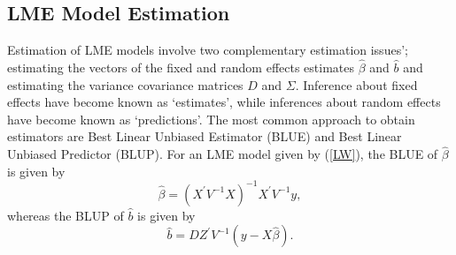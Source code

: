\documentclass[12pt, a4paper]{report}
\theoremstyle{plain}
\theoremstyle{definition}
\theoremstyle{remark}
\begin{document}
			
			
\subsection{LME Model Estimation}
Estimation of LME models involve two complementary estimation issues'; estimating the vectors of the fixed and random effects estimates $\hat{\beta}$ and $\hat{b}$ and estimating the variance covariance matrices $D$ and $\Sigma$. Inference about fixed effects have become known as `estimates', while inferences about random effects have become known as `predictions'. The most common approach to obtain estimators are Best Linear Unbiased Estimator (BLUE) and Best Linear Unbiased Predictor (BLUP). For an LME model given by (\ref{LW}), the BLUE of $\hat{\beta}$ is given by
\begin{equation}
\hat{\beta} = (X^\prime V^{-1}X)^{-1}X^\prime V^{-1}y,
\end{equation}whereas the BLUP of $\hat{b}$ is given by
\begin{equation}
\hat{b} = DZ^{\prime} V^{-1} (y-X\hat{\beta}).
\end{equation}
\end{document}
